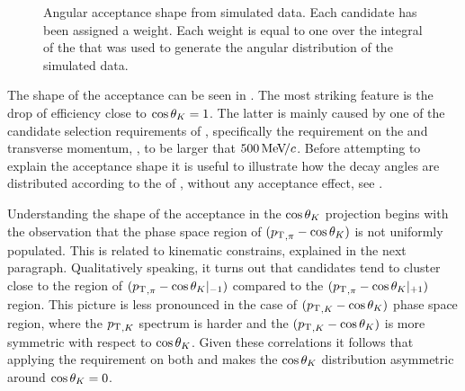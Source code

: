 \begin{figure}[t]
  \centering
  \begin{subfigure}{0.49\textwidth}
    \raggedright
    \scalebox{1.12}{}
    \caption{}
    \label{angAcc_ctk}
  \end{subfigure}%
  \hfill%
  \begin{subfigure}{0.49\textwidth}
    \raggedleft
    \scalebox{1.12}{}
    \caption{}
    \label{angAcc_ctl}
  \end{subfigure}
  \vspace*{0.02\textwidth}
  \begin{subfigure}{0.49\textwidth}
    \raggedright
    \scalebox{1.12}{}
    \caption{}
    \label{angAcc_phi}
  \end{subfigure}
  \caption{Angular acceptance shape from simulated data. Each candidate has been assigned a weight. Each weight is
           equal to one over the integral of the \pdf that was used to generate the angular distribution of the simulated data.}
  \label{angAcc_all}
\end{figure}

The shape of the acceptance can be seen in . The most striking feature is the drop of efficiency
close to $\cos\theta_{K}=1$. The latter is mainly caused by one of the candidate selection requirements of ,
specifically the requirement on the \kaon and \pion transverse momentum, \pt, to be larger that $500{\mathrm{\,Me\kern -0.1em V\!/}c}$.
Before attempting to explain the acceptance shape it is useful to illustrate how the decay angles are
distributed according to the \pdf of , \ie without any acceptance effect, see .

Understanding the shape of the acceptance in the $\cos\theta_{K}$ projection begins with the observation
that the phase space region of $(\mbox{$p_{\rm T}$}_{,\pi}-\cos\theta_{K})$ is not uniformly populated. This is related to kinematic
constrains, explained in the next paragraph. Qualitatively speaking, it turns out that \Bs candidates tend to cluster
close to the region of $(\mbox{$p_{\rm T}$}_{,\pi}-\cos\theta_{K}|_{-1})$ compared to the $(\mbox{$p_{\rm T}$}_{,\pi}-\cos\theta_{K}|_{+1})$ region.
This picture is less pronounced in the case of $(\mbox{$p_{\rm T}$}_{,K}-\cos\theta_{K})$ phase space region, where the $\mbox{$p_{\rm T}$}_{,K}$
spectrum is harder and the $(\mbox{$p_{\rm T}$}_{,K}-\cos\theta_{K})$ is more symmetric with respect to $\cos\theta_{K}$. Given these
correlations it follows that applying the \pt requirement on both \kaon and \pion makes the $\cos\theta_{K}$ distribution
asymmetric around $\cos\theta_{K}=0$.

